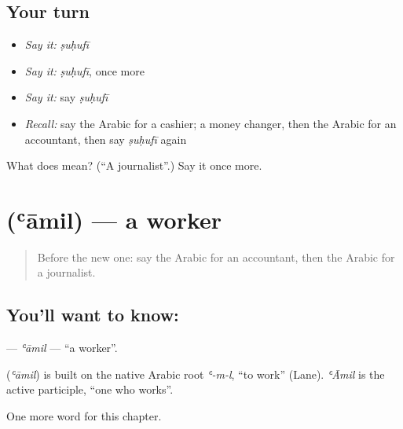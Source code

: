 \subsection*{Your turn}
\begin{itemize}
\raggedright
  \item \emph{Say it:} \emph{ṣuḥufī}
  \item \emph{Say it:} \emph{ṣuḥufī}, once more
  \item \emph{Say it:} say \emph{ṣuḥufī}
  \item \emph{Recall:} say the Arabic for a cashier; a money changer, then the Arabic for an accountant, then say \emph{ṣuḥufī} again
\end{itemize}

\begin{tcolorbox}[breakable,colback=teal!4,colframe=teal!35!black,title={Before you move on}]
What does  mean? (\textquotedblleft{}A journalist\textquotedblright{}.) Say it once more.
\end{tcolorbox}
\section[\texorpdfstring{\ar{عامل} (ʿāmil)}{عامل (ʿāmil)}]{ (ʿāmil) — a worker}

\label{lesson:AR-C189-amil}



\begin{quote}
Before the new one: say the Arabic for an accountant, then the Arabic for a journalist.
\end{quote}

\subsection*{You'll want to know: }
\textbf{} — \emph{ʿāmil} — \textquotedblleft{}a worker\textquotedblright{}.

\begin{cousinweb}
\textbf{} (\emph{ʿāmil}) is built on the native Arabic root \emph{ʿ-m-l}, \textquotedblleft{}to work\textquotedblright{} (Lane). \emph{ʿĀmil} is the active participle, \textquotedblleft{}one who works\textquotedblright{}.
\end{cousinweb}

\begin{grammarlens}[title={What you've built}]
One more word for this chapter.
\end{grammarlens}


